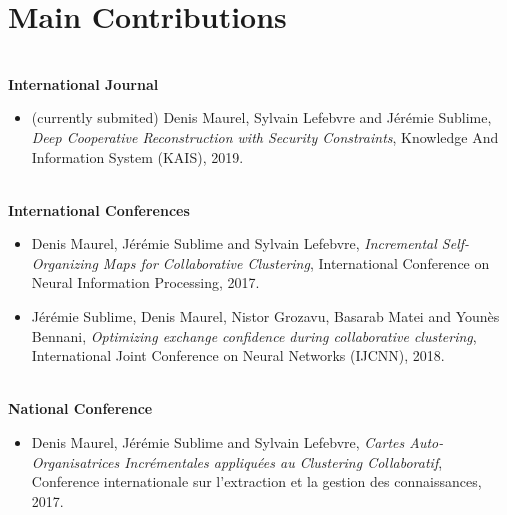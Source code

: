 \section{Main Contributions}

\textbf{\\International Journal}

\begin{itemize}
    \item (currently submited) Denis Maurel, Sylvain Lefebvre and J{\'{e}}r{\'{e}}mie Sublime,
        \textit{Deep Cooperative Reconstruction with Security Constraints},
        Knowledge And Information System (KAIS),
        2019.
\end{itemize}

\textbf{\\International Conferences}

\begin{itemize}
    \item Denis Maurel, J{\'e}r{\'e}mie Sublime and Sylvain Lefebvre,
        \textit{Incremental Self-Organizing Maps for Collaborative Clustering},
        International Conference on Neural Information Processing,
        2017.

    \item J{\'e}r{\'e}mie Sublime, Denis Maurel, Nistor Grozavu, Basarab Matei and Younès Bennani,
        \textit{Optimizing exchange confidence during collaborative clustering},
        International Joint Conference on Neural Networks (IJCNN),
        2018.
\end{itemize}

\textbf{\\National Conference}

\begin{itemize}
    \item Denis Maurel, J{\'e}r{\'e}mie Sublime and Sylvain Lefebvre,
        \textit{Cartes Auto-Organisatrices Incrémentales appliquées au Clustering Collaboratif},
        Conf{e}rence internationale sur l'extraction et la gestion des connaissances,
        2017.
\end{itemize}
